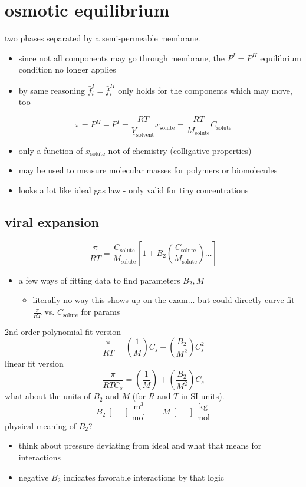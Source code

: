 \documentclass{article}
\begin{document}
\section*{osmotic equilibrium}
two phases separated by a semi-permeable membrane. 
\begin{itemize}
    \item since not all components may go through membrane, the $P^{I}=P^{II}$ equilibrium condition no longer applies
    \item by same reasoning $\bar{f}_{i}^{I}=\bar{f}_{i}^{II}$ only holds for the components which may move, too
\end{itemize}
\[
\pi = P^{II}-P^{I} = \frac{RT}{\underline{V}_{\mathrm{solvent}}} x_{\mathrm{solute}} = \frac{RT}{M_{\mathrm{solute}}}C_{\mathrm{solute}}
\]
\begin{itemize}
    \item only a function of $x_{\mathrm{solute}}$ not of chemistry (colligative properties)
    \item may be used to measure molecular masses for polymers or biomolecules
    \item looks a lot like ideal gas law - only valid for tiny concentrations
\end{itemize}

\subsection*{viral expansion}
\[
\frac{\pi}{RT} = \frac{C_{\mathrm{solute}}}{M_{\mathrm{solute}}} \left[ 1 + B_{2} \left( \frac{C_{\mathrm{solute}}}{M_{\mathrm{solute}}} \right) \dots \right]
\]
\begin{itemize}
    \item a few ways of fitting data to find parameters $B_{2} , M$
    \begin{itemize}
        \item literally no  way this shows up on the exam... but could directly curve fit $\displaystyle\frac{\pi}{RT}$ vs. $C_{\mathrm{solute}}$ for params
    \end{itemize}
\end{itemize}
2nd order polynomial fit version
\[
\frac{\pi}{RT} = \left(\frac{1}{M}\right) C_{s} + \left(\frac{B_2}{M^2}\right) C_{s}^2
\]
linear fit version
\[
\frac{\pi}{RT C_s} = \left(\frac{1}{M}\right) + \left(\frac{B_2}{M^2}\right) C_{s}
\]
what about the units of $B_{2}$ and $M$ (for $R$ and $T$ in SI units). 
\[
B_2 \ [=] \ \frac{\text{m}^3}{\text{mol}} \quad \quad M \ [=] \ \frac{\text{kg}}{\text{mol}}
\]
physical meaning of $B_{2}$?
\begin{itemize}
    \item think about pressure deviating from ideal and what that means for interactions
    \item negative $B_{2}$ indicates favorable interactions by that logic
\end{itemize}
\end{document}
